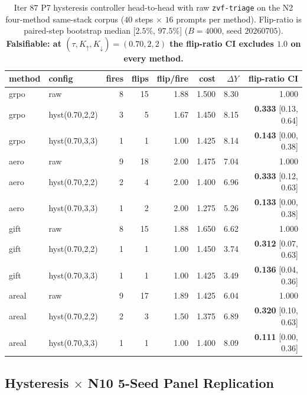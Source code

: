 \documentclass{article}
\begin{document}
\begin{table}[t]
\centering
\small
\caption{Iter $87$ P7 hysteresis controller head-to-head with raw
\texttt{zvf-triage} on the N2 four-method same-stack corpus
($40$ steps $\times$ $16$ prompts per method).
Flip-ratio is paired-step bootstrap median [$2.5$\%, $97.5$\%]
($B = 4000$, seed $20260705$).
\textbf{Falsifiable: at $(\tau, K_{\uparrow}, K_{\downarrow}) =
(0.70, 2, 2)$ the flip-ratio CI excludes $1.0$ on every method.}}
\label{tab:p7-iter87-hysteresis}
\begin{tabular}{llrrrrrr}
\hline
method & config & fires & flips & flip/fire
& cost & $\Delta Y$ & flip-ratio CI \\
\hline
grpo & raw             & 8 & 15 & 1.88 & 1.500 & 8.30 & 1.000 \\
grpo & hyst(0.70,2,2)  & 3 & 5  & 1.67 & 1.450 & 8.15 & \textbf{0.333} [0.13, 0.64] \\
grpo & hyst(0.70,3,3)  & 1 & 1  & 1.00 & 1.425 & 8.14 & \textbf{0.143} [0.00, 0.38] \\
aero & raw             & 9 & 18 & 2.00 & 1.475 & 7.04 & 1.000 \\
aero & hyst(0.70,2,2)  & 2 & 4  & 2.00 & 1.400 & 6.96 & \textbf{0.333} [0.12, 0.63] \\
aero & hyst(0.70,3,3)  & 1 & 2  & 2.00 & 1.275 & 5.26 & \textbf{0.133} [0.00, 0.38] \\
gift & raw             & 8 & 15 & 1.88 & 1.650 & 6.62 & 1.000 \\
gift & hyst(0.70,2,2)  & 1 & 1  & 1.00 & 1.450 & 3.74 & \textbf{0.312} [0.07, 0.63] \\
gift & hyst(0.70,3,3)  & 1 & 1  & 1.00 & 1.425 & 3.49 & \textbf{0.136} [0.04, 0.36] \\
areal& raw             & 9 & 17 & 1.89 & 1.425 & 6.04 & 1.000 \\
areal& hyst(0.70,2,2)  & 2 & 3  & 1.50 & 1.375 & 6.89 & \textbf{0.320} [0.10, 0.63] \\
areal& hyst(0.70,3,3)  & 1 & 1  & 1.00 & 1.400 & 8.09 & \textbf{0.111} [0.00, 0.36] \\
\hline
\end{tabular}
\end{table} \subsection{Hysteresis \texorpdfstring{$\times$}{x} N10 5-Seed Panel Replication}
\label{sec:p7-hysteresis-n10}
\end{document}
